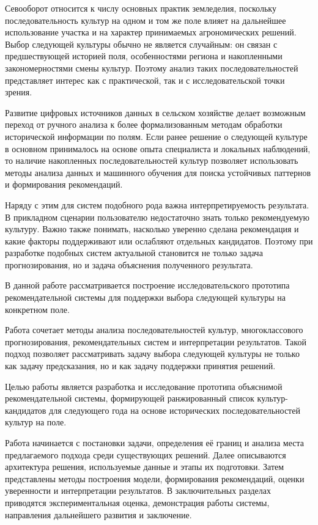 
Севооборот относится к числу основных практик земледелия, поскольку последовательность культур на одном и том же поле
влияет на дальнейшее использование участка и на характер принимаемых агрономических решений. Выбор следующей культуры
обычно не является случайным: он связан с предшествующей историей поля, особенностями региона и накопленными
закономерностями смены культур. Поэтому анализ таких последовательностей представляет интерес как с практической, так и
с исследовательской точки зрения.

Развитие цифровых источников данных в сельском хозяйстве делает возможным переход от ручного анализа к более
формализованным методам обработки исторической информации по полям. Если ранее решение о следующей культуре в основном
принималось на основе опыта специалиста и локальных наблюдений, то наличие накопленных последовательностей культур
позволяет использовать методы анализа данных и машинного обучения для поиска устойчивых паттернов и формирования
рекомендаций.

Наряду с этим для систем подобного рода важна интерпретируемость результата. В прикладном сценарии пользователю
недостаточно знать только рекомендуемую культуру. Важно также понимать, насколько уверенно сделана рекомендация и какие
факторы поддерживают или ослабляют отдельных кандидатов. Поэтому при разработке подобных систем актуальной становится не
только задача прогнозирования, но и задача объяснения полученного результата.

В данной работе рассматривается построение исследовательского прототипа 
рекомендательной системы для поддержки выбора
следующей культуры на конкретном поле.

Работа сочетает методы анализа последовательностей культур, многоклассового прогнозирования, рекомендательных систем
и интерпретации результатов. Такой подход позволяет рассматривать задачу выбора следующей культуры не только как задачу
предсказания, но и как задачу поддержки принятия решений.

Целью работы является разработка и исследование прототипа объяснимой рекомендательной системы, формирующей
ранжированный список культур-кандидатов для следующего года на основе исторических последовательностей культур на поле.

Работа начинается с постановки задачи, определения её границ и анализа места предлагаемого подхода среди существующих решений.
Далее описываются архитектура решения, используемые
данные и этапы их подготовки. Затем представлены методы построения модели, формирования рекомендаций, оценки
уверенности и интерпретации результатов. В заключительных разделах приводятся экспериментальная оценка,
демонстрация работы системы, направления дальнейшего развития и заключение.
